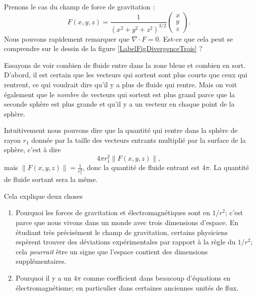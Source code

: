 \begin{example}
    Prenons le cas du champ de force de gravitation :
    \begin{equation}
        F(x,y,z)=\frac{1}{ (x^2+y^2+z^2)^{3/2} }\begin{pmatrix}
            x    \\ 
            y   \\
            z
        \end{pmatrix}.
    \end{equation}
    Nous pouvons rapidement remarquer que $\nabla\cdot F=0$. Est-ce que cela peut se comprendre sur le dessin de la figure \ref{LabelFigDivergenceTrois} ?
    \newcommand{\CaptionFigDivergenceTrois}{Le champ de vecteur de la gravité. Nous avons tracé, sur les deux cercles la même densité de vecteurs, c'est à dire le même nombre de vecteurs par unité de surface.}
    

    Essayons de voir combien de fluide entre dans la zone bleue et combien en sort. D'abord, il est certain que les vecteurs qui sortent sont plus courts que ceux qui rentrent, ce qui voudrait dire qu'il y a plus de fluide qui rentre. Mais on voit également que le \emph{nombre} de vecteurs qui sortent est plus grand parce que la seconde sphère est plus grande et qu'il y a un vecteur en chaque point de la sphère.

    Intuitivement nous pouvons dire que la quantité qui rentre dans la sphère de rayon $r_1$ donnée par la taille des vecteurs entrants multiplié par la surface de la sphère, c'est à dire
    \begin{equation}        \label{EqQpinormeVectoOM}
        4\pi r_1^2\| F(x,y,z) \|,
    \end{equation}
    mais $\| F(x,y,z) \|=\frac{1}{ r_1^2 }$, donc la quantité de fluide entrant est $4\pi$. La quantité de fluide sortant sera la même.

    Cela explique deux choses
    \begin{enumerate}
        \item
            Pourquoi les forces de gravitation et électromagnétiques sont en $1/r^2$; c'est parce que nous vivons dans un monde avec trois dimensions d'espace. En étudiant très précisément le champ de gravitation, certains physiciens espèrent trouver des déviations expérimentales par rapport à la règle du \( 1/r^2\); cela \emph{pourrait} être un signe que l'espace contient des dimensions supplémentaires.
        \item
            Pourquoi il y a un $4\pi$ comme coefficient dans beaucoup d'équations en électromagnétisme; en particulier dans certaines anciennes unités de flux.
    \end{enumerate}
    
\end{example}

